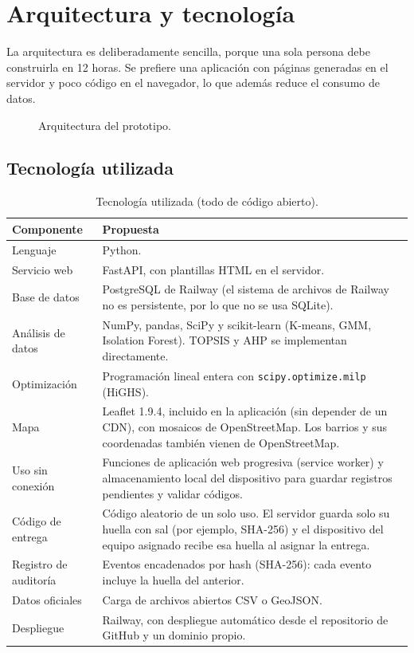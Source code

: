 \section{Arquitectura y tecnología}

La arquitectura es deliberadamente sencilla, porque una sola persona debe construirla en 12 horas. Se prefiere una aplicación con páginas generadas en el servidor y poco código en el navegador, lo que además reduce el consumo de datos.

\begin{figure}[H]
\centering
\resizebox{\textwidth}{!}{}
\caption{Arquitectura del prototipo.}
\label{fig:arquitectura}
\end{figure}

\subsection{Tecnología utilizada}
\begin{table}[H]
\centering
\caption{Tecnología utilizada (todo de código abierto).}
\begin{tabularx}{\textwidth}{@{}p{3.6cm}X@{}}
\toprule
\textbf{Componente} & \textbf{Propuesta} \\
\midrule
Lenguaje & Python. \\
Servicio web & FastAPI, con plantillas HTML en el servidor. \\
Base de datos & PostgreSQL de Railway (el sistema de archivos de Railway no es persistente, por lo que no se usa SQLite). \\
Análisis de datos & NumPy, pandas, SciPy y scikit-learn (K-means, GMM, Isolation Forest). TOPSIS y AHP se implementan directamente. \\
Optimización & Programación lineal entera con \texttt{scipy.optimize.milp} (HiGHS). \\
Mapa & Leaflet 1.9.4, incluido en la aplicación (sin depender de un CDN), con mosaicos de OpenStreetMap. Los barrios y sus coordenadas también vienen de OpenStreetMap. \\
Uso sin conexión & Funciones de aplicación web progresiva (service worker) y almacenamiento local del dispositivo para guardar registros pendientes y validar códigos. \\
Código de entrega & Código aleatorio de un solo uso. El servidor guarda solo su huella con sal (por ejemplo, SHA-256) y el dispositivo del equipo asignado recibe esa huella al asignar la entrega. \\
Registro de auditoría & Eventos encadenados por hash (SHA-256): cada evento incluye la huella del anterior. \\
Datos oficiales & Carga de archivos abiertos CSV o GeoJSON. \\
Despliegue & Railway, con despliegue automático desde el repositorio de GitHub y un dominio propio. \\
\bottomrule
\end{tabularx}
\end{table}

